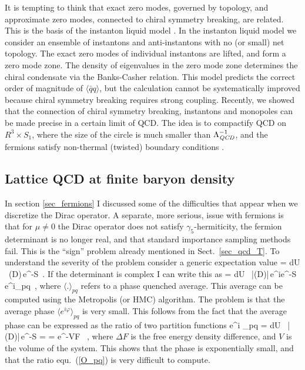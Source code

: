  It is tempting to think that exact zero modes, governed by topology, 
and approximate zero modes, connected to chiral symmetry breaking,
are related. This is the basis of the instanton liquid model
\cite{Schafer:1996wv}. In the instanton liquid model we consider an 
ensemble of instantons and anti-instantons with no (or small) net 
topology. The exact zero modes of individual instantons are lifted, 
and form a zero mode zone. The density of eigenvalues in the zero 
mode zone determines the chiral condensate via the Banks-Casher relation. 
This model predicts the correct order of magnitude of $\langle\bar{q}q
\rangle$, but the calculation cannot be systematically improved
because chiral symmetry breaking requires strong coupling. Recently,
we showed that the connection of chiral symmetry breaking, instantons
and monopoles can be made precise in a certain limit of QCD. The
idea is to compactify QCD on $R^3\times S_1$, where the size of the 
circle is much smaller than $\Lambda^{-1}_{\it QCD}$, and the fermions 
satisfy non-thermal (twisted) boundary conditions \cite{Cherman:2016hcd}.

\subsection{Lattice QCD at finite baryon density}
\label{sec_lQCD_mu}
 
 In section \ref{sec_fermions} I discussed some of the difficulties 
that appear when we discretize the Dirac operator.  A separate, more 
serious, issue with fermions is that for $\mu\neq 0$ the Dirac
operator does not satisfy $\gamma_5$-hermiticity, the fermion 
determinant is no longer real, and that standard importance sampling 
methods fail. This is the ``sign'' problem already mentioned in 
Sect.~\ref{sec_qcd_T}. To understand the severity of the problem 
consider a generic expectation value 
\be
{} \rangle = 
       {\int dU \, \det(D)\,e^{-S}}\, . 
\ee
If the determinant is complex I can write this as
\be
\label{O_pq}
 \rangle = 
       {\int dU \, |\det(D)|\,e^{i\varphi}e^{-S}}
 \equiv {}
             {\langle e^{i\varphi}\rangle_{pq}}\, , 
\ee
where $\langle .\rangle_{pq}$ refers to a phase quenched average. This
average can be computed using the Metropolis (or HMC) algorithm. The 
problem is that the average phase $\langle e^{i\varphi}\rangle_{pq}$ is
very small. This follows from the fact that the average phase can
be expressed as the ratio of two partition functions
\be
\label{ph_av}
\langle e^{i\varphi} \rangle_{pq} = 
       {\int dU \, |\det(D)|\,e^{-S}}
 =  = e^{-V\Delta F} \, , 
\ee
where $\Delta F$ is the free energy density difference, and $V$ is the 
volume of the system. This shows that the phase is exponentially small, 
and that the ratio equ.~(\ref{O_pq}) is very difficult to compute. 

